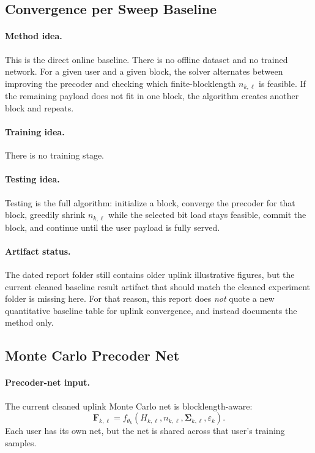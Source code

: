 \documentclass[11pt]{article}
\newcommand{\F}{\mathbf{F}}
\newcommand{\Sig}{\mathbf{\Sigma}}
\begin{document}
\subsection{Convergence per Sweep Baseline}
\paragraph{Method idea.}
This is the direct online baseline. There is no offline dataset and no trained network. For a given user and a given block, the solver alternates between improving the precoder and checking which finite-blocklength \(n_{k,\ell}\) is feasible. If the remaining payload does not fit in one block, the algorithm creates another block and repeats.

\paragraph{Training idea.}
There is no training stage.

\paragraph{Testing idea.}
Testing is the full algorithm: initialize a block, converge the precoder for that block, greedily shrink \(n_{k,\ell}\) while the selected bit load stays feasible, commit the block, and continue until the user payload is fully served.

\paragraph{Artifact status.}
The dated report folder still contains older uplink illustrative figures, but the current cleaned baseline result artifact that should match the cleaned experiment folder is missing here. For that reason, this report does \emph{not} quote a new quantitative baseline table for uplink convergence, and instead documents the method only.

\subsection{Monte Carlo Precoder Net}
\paragraph{Precoder-net input.}
The current cleaned uplink Monte Carlo net is blocklength-aware:
\begin{equation}
\F_{k,\ell} = f_{\theta_k}(H_{k,\ell}, n_{k,\ell}, \Sig_{k,\ell}, \varepsilon_k).
\end{equation}
Each user has its own net, but the net is shared across that user's training samples.
\end{document}
